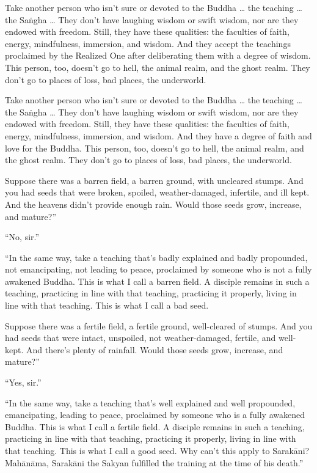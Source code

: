 \documentclass[12pt,openany]{book}%
\begin{document}
Take another person who isn’t sure or devoted to the Buddha … the teaching … the \textsanskrit{Saṅgha} … They don’t have laughing wisdom or swift wisdom, nor are they endowed with freedom. Still, they have these qualities: the faculties of faith, energy, mindfulness, immersion, and wisdom. And they accept the teachings proclaimed by the Realized One after deliberating them with a degree of wisdom. This person, too, doesn’t go to hell, the animal realm, and the ghost realm. They don’t go to places of loss, bad places, the underworld. 

Take another person who isn’t sure or devoted to the Buddha … the teaching … the \textsanskrit{Saṅgha} … They don’t have laughing wisdom or swift wisdom, nor are they endowed with freedom. Still, they have these qualities: the faculties of faith, energy, mindfulness, immersion, and wisdom. And they have a degree of faith and love for the Buddha. This person, too, doesn’t go to hell, the animal realm, and the ghost realm. They don’t go to places of loss, bad places, the underworld. 

Suppose there was a barren field, a barren ground, with uncleared stumps. And you had seeds that were broken, spoiled, weather-damaged, infertile, and ill kept. And the heavens didn’t provide enough rain. Would those seeds grow, increase, and mature?” 

“No, sir.” 

“In the same way, take a teaching that’s badly explained and badly propounded, not emancipating, not leading to peace, proclaimed by someone who is not a fully awakened Buddha. This is what I call a barren field. A disciple remains in such a teaching, practicing in line with that teaching, practicing it properly, living in line with that teaching. This is what I call a bad seed. 

Suppose there was a fertile field, a fertile ground, well-cleared of stumps. And you had seeds that were intact, unspoiled, not weather-damaged, fertile, and well-kept. And there’s plenty of rainfall. Would those seeds grow, increase, and mature?” 

“Yes, sir.” 

“In the same way, take a teaching that’s well explained and well propounded, emancipating, leading to peace, proclaimed by someone who is a fully awakened Buddha. This is what I call a fertile field. A disciple remains in such a teaching, practicing in line with that teaching, practicing it properly, living in line with that teaching. This is what I call a good seed. Why can’t this apply to \textsanskrit{Sarakāni}? \textsanskrit{Mahānāma}, \textsanskrit{Sarakāni} the Sakyan fulfilled the training at the time of his death.” 
\end{document}
